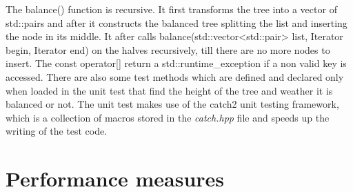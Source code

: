 \documentclass[a4paper,11pt]{article}
\begin{document}
The balance() function is recursive. It first transforms the tree into a vector of std::pairs and after it  constructs the balanced tree splitting the list and inserting the node in its middle. It after calls balance(std::vector<std::pair> list, Iterator begin, Iterator end) on the halves recursively, till there are no more nodes to insert.
The const operator[] return a std::runtime\_exception if a non valid key is accessed.
There are also some test methods which are defined and declared only when loaded in the unit test that find the height of the tree and weather it is balanced or not. 
The unit test makes use of the catch2 unit testing framework, which is a collection of macros stored in the \emph{catch.hpp} file and speeds up the writing of the test code. 



\section*{Performance measures}



\vspace{2cm}
\end{document}
